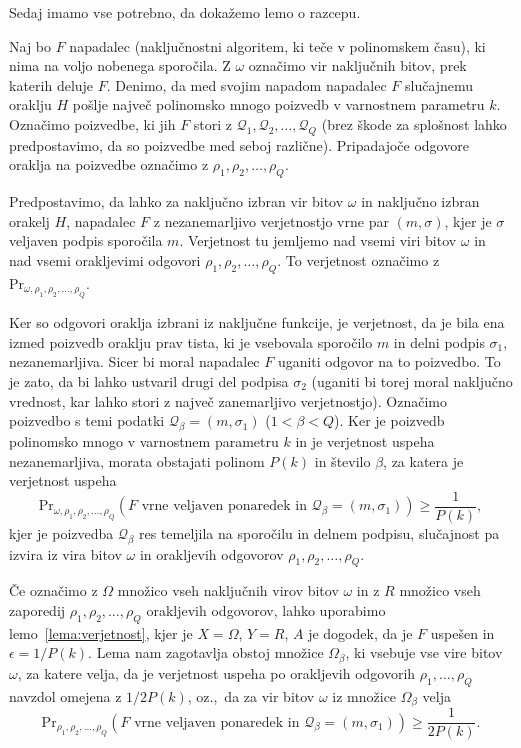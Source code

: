 \documentclass[isrm2, tisk]{fmfdelo}
\begin{document}
Sedaj imamo vse potrebno, da dokažemo lemo o razcepu.

\begin{dokaz}
    Naj bo $F$ napadalec (naključnostni algoritem, ki teče v polinomskem času), ki nima na voljo
    nobenega sporočila. Z $\omega$ označimo vir naključnih bitov, prek katerih deluje $F$. Denimo,
    da med svojim napadom napadalec $F$ slučajnemu oraklju $H$ pošlje največ polinomsko mnogo poizvedb
    v varnostnem parametru $k$. Označimo  poizvedbe, ki jih $F$ stori z $\mathcal{Q}_1, \mathcal{Q}_2,
    \dots, \mathcal{Q}_Q$ (brez škode za splošnost lahko predpostavimo, da so poizvedbe med seboj
    različne). Pripadajoče odgovore oraklja na poizvedbe označimo z $\rho_1, \rho_2 , \dots, \rho_Q$.

    Predpostavimo, da lahko za naključno izbran vir bitov $\omega$ in naključno izbran orakelj $H$,
    napadalec $F$ z nezanemarljivo verjetnostjo vrne par $(m, \sigma)$, kjer je $\sigma$ veljaven podpis
    sporočila $m$. Verjetnost tu jemljemo nad vsemi viri bitov $\omega$ in nad vsemi orakljevimi
    odgovori $\rho_1, \rho_2, \dots, \rho_Q$. To verjetnost označimo z $\text{Pr}_{\omega, \rho_1,
    \rho_2 , \dots, \rho_Q}$. 

    Ker so odgovori oraklja izbrani iz naključne funkcije, je verjetnost, da je bila ena izmed
    poizvedb oraklju prav tista, ki je vsebovala sporočilo $m$ in delni podpis $\sigma_1$,
    nezanemarljiva. Sicer bi moral napadalec $F$ uganiti odgovor na to poizvedbo. To je zato, da bi
    lahko ustvaril drugi del podpisa $\sigma_2$ (uganiti bi torej moral naključno vrednost, kar lahko
    stori z največ zanemarljivo verjetnostjo). Označimo poizvedbo s temi podatki $\mathcal{Q}_\beta
    = (m, \sigma_1)$ ($1 < \beta < Q$). Ker je poizvedb polinomsko mnogo v varnostnem parametru $k$
    in je verjetnost uspeha nezanemarljiva, morata obstajati polinom $P(k)$ in število $\beta$, za
    katera je verjetnost uspeha
    $$
    \text{Pr}_{\omega, \rho_1, \rho_2 , \dots, \rho_Q}(\text{$F$ vrne veljaven ponaredek in } \mathcal{Q}_\beta
    = (m, \sigma_1)) \geq \frac{1}{P(k)},
    $$
    kjer je poizvedba $\mathcal{Q}_\beta$ res temeljila na sporočilu in delnem podpisu, slučajnost
    pa izvira iz vira bitov $\omega$ in orakljevih odgovorov $\rho_1, \rho_2, \dots, \rho_Q$.

    Če označimo z $\Omega$ množico vseh naključnih virov bitov $\omega$ in z $R$ množico vseh
    zaporedij $\rho_1, \rho_2, \dots, \rho_Q$ orakljevih odgovorov, lahko uporabimo lemo~\ref{lema:verjetnost},
    kjer je $X = \Omega$, $Y = R$, $A$ je dogodek, da je $F$ uspešen in $\epsilon = 1/P(k)$.
    Lema nam zagotavlja obstoj množice $\Omega_\beta$, ki vsebuje vse vire bitov $\omega$, za katere
    velja, da je verjetnost uspeha po orakljevih odgovorih $\rho_1, \dots, \rho_Q$ navzdol omejena z
    $1/2P(k)$, oz.,\ da za vir bitov $\omega$ iz množice $\Omega_\beta$ velja
    $$
    \text{Pr}_{\rho_1, \rho_2, \dots, \rho_Q}(\text{$F$ vrne veljaven ponaredek in } \mathcal{Q}_\beta
    = (m, \sigma_1)) \geq \frac{1}{2P(k)}.
    $$


\end{dokaz}
\end{document}
